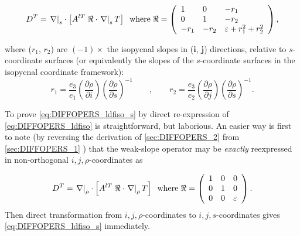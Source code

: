 \documentclass[../main/NEMO_manual]{subfiles}
\begin{document}
\begin{equation}
  \label{eq:DIFFOPERS_ldfiso_s}
  D^T = \left. \nabla \right|_s \cdot
  \left[ A^{lT} \;\Re \cdot \left. \nabla \right|_s T  \right] \\
  \;\;\text{where} \;\Re =\left( {{
        \begin{array}{*{20}c}
          1 \hfill & 0 \hfill & {-r _1 } \hfill \\
          0 \hfill & 1 \hfill & {-r _2 } \hfill \\
          {-r _1 } \hfill & {-r _2 } \hfill & {\varepsilon +r _1
                                              ^2+r _2 ^2} \hfill \\
        \end{array}
      }} \right),
\end{equation}

where ($r_1$, $r_2$) are $(-1)\times$ the isopycnal slopes in ($\textbf{i}$, $\textbf{j}$) directions,
relative to $s$-coordinate surfaces (or equivalently the slopes of the
$s$-coordinate surfaces in the isopycnal coordinate framework):
\[
  r_1 =\frac{e_3 }{e_1 }\left( {\frac{\partial \rho }{\partial i}} \right)\left( {\frac{\partial \rho }{\partial s}} \right)^{-1}
  \qquad , \qquad
  r_2 =\frac{e_3 }{e_2 }\left( {\frac{\partial \rho }{\partial j}}
  \right)\left( {\frac{\partial \rho }{\partial s}} \right)^{-1}.
\]

To prove \autoref{eq:DIFFOPERS_ldfiso_s} by direct re-expression of \autoref{eq:DIFFOPERS_ldfiso} is straightforward, but laborious.
An easier way is first to note (by reversing the derivation of \autoref{sec:DIFFOPERS_2} from \autoref{sec:DIFFOPERS_1} ) that
the weak-slope operator may be \emph{exactly} reexpressed in non-orthogonal $i,j,\rho$-coordinates as

\begin{equation}
  \label{eq:DIFFOPERS_5}
  D^T = \left. \nabla \right|_\rho \cdot
  \left[ A^{lT} \;\Re \cdot \left. \nabla \right|_\rho T  \right] \\
  \;\;\text{where} \;\Re =\left( {{
        \begin{array}{*{20}c}
          1 \hfill & 0 \hfill &0 \hfill \\
          0 \hfill & 1 \hfill & 0 \hfill \\
          0 \hfill & 0 \hfill & \varepsilon \hfill \\
        \end{array}
      }} \right).
\end{equation}
Then direct transformation from $i,j,\rho$-coordinates to $i,j,s$-coordinates gives
\autoref{eq:DIFFOPERS_ldfiso_s} immediately.
\end{document}
